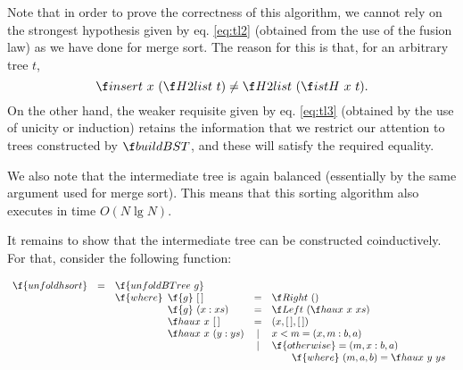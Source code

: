 \documentclass[a4paper,11pt]{llncs}
\begin{document}
Note that in order to prove the correctness of this algorithm, we
cannot rely on the strongest hypothesis given by eq. \ref{eq:tl2}
(obtained from the use of the fusion law) as we have done for merge
sort. The reason for this is that, for an arbitrary tree $t$,
\[ \insert\ x\ (\H2list\ t) \not= \H2list\ (\istH\ x\ t). \]
\noindent On the other hand, the weaker requisite given by
eq. \ref{eq:tl3} (obtained by the use of unicity or induction) retains
the information that we restrict our attention to trees constructed by
$\buildBST$, and these will satisfy the required equality.

We also note that the intermediate tree is again balanced (essentially
by the same argument used for merge sort). This means that this
sorting algorithm also executes in time $O(N\lg N)$.

It remains to show that the intermediate tree can be constructed
coinductively. For that, consider the following function:

\[
\begin{array}{lcl}
  \f{unfoldhsort} & = & \f{unfoldBTree\ g}\\
  &&\f{where}
  \begin{array}[t]{lcl}
    \f{g}\ \Nil  & = & \Right\ () \\
    \f{g}\ (x:xs)  & = & \Left\ (\haux\ x\ xs)\\
    \haux\ x\ \Nil  & = & (x,\Nil,\Nil) \\
    \haux\ x\ (y:ys) & | & x<m = (x,m:b,a) \\
    & | & \f{otherwise} = (m,x:b,a)\\
    & & \qquad \f{where}\ (m,a,b) = \haux\ y\ ys
  \end{array} 
\end{array}
\]
\end{document}

